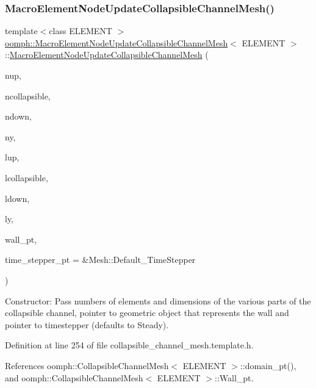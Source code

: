 \subsubsection{\texorpdfstring{Macro\+Element\+Node\+Update\+Collapsible\+Channel\+Mesh()}{MacroElementNodeUpdateCollapsibleChannelMesh()}}
{\footnotesize\ttfamily template$<$class E\+L\+E\+M\+E\+NT $>$ \\
\hyperlink{classoomph_1_1MacroElementNodeUpdateCollapsibleChannelMesh}{oomph\+::\+Macro\+Element\+Node\+Update\+Collapsible\+Channel\+Mesh}$<$ E\+L\+E\+M\+E\+NT $>$\+::\hyperlink{classoomph_1_1MacroElementNodeUpdateCollapsibleChannelMesh}{Macro\+Element\+Node\+Update\+Collapsible\+Channel\+Mesh} (\begin{DoxyParamCaption}\item[{const unsigned \&}]{nup,  }\item[{const unsigned \&}]{ncollapsible,  }\item[{const unsigned \&}]{ndown,  }\item[{const unsigned \&}]{ny,  }\item[{const double \&}]{lup,  }\item[{const double \&}]{lcollapsible,  }\item[{const double \&}]{ldown,  }\item[{const double \&}]{ly,  }\item[{Geom\+Object $\ast$}]{wall\+\_\+pt,  }\item[{Time\+Stepper $\ast$}]{time\+\_\+stepper\+\_\+pt = {\ttfamily \&Mesh\+:\+:Default\+\_\+TimeStepper} }\end{DoxyParamCaption})\hspace{0.3cm}{\ttfamily [inline]}}



Constructor\+: Pass numbers of elements and dimensions of the various parts of the collapsible channel, pointer to geometric object that represents the wall and pointer to timestepper (defaults to Steady). 



Definition at line 254 of file collapsible\+\_\+channel\+\_\+mesh.\+template.\+h.



References oomph\+::\+Collapsible\+Channel\+Mesh$<$ E\+L\+E\+M\+E\+N\+T $>$\+::domain\+\_\+pt(), and oomph\+::\+Collapsible\+Channel\+Mesh$<$ E\+L\+E\+M\+E\+N\+T $>$\+::\+Wall\+\_\+pt.

\mbox{\label{classoomph_1_1MacroElementNodeUpdateCollapsibleChannelMesh_a284ffdb8ab08e5f817b14d69913f4496}} 
